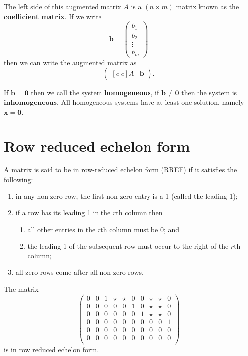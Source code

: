 The left side of this augmented matrix $A$ is a $(n\times m)$ matrix known as the \textbf{coefficient matrix}. If we write 
\[
    \bm b=
    \begin{pmatrix}
        b_1\\b_2\\\vdots\\b_m
    \end{pmatrix}
\]
then we can write the augmented matrix as
\[
    \begin{pmatrix}[c|c]
        A&\bm b
    \end{pmatrix}
    .
\]

If $\bm b=\bm0$ then we call the system \textbf{homogeneous}, if $\bm b\neq\bm0$ then the system is \textbf{inhomogeneous}. All homogeneous systems have at least one solution, namely $\bm x=\bm0$.

\section{Row reduced echelon form}

\begin{definition}
    A matrix is said to be in row-reduced echelon form (RREF) if it satisfies the following:
    \begin{enumerate}
        \item in any non-zero row, the first non-zero entry is a 1 (called the leading 1);
        \item if a row has its leading 1 in the $r$th column then
        \begin{enumerate}
            \item all other entries in the $r$th column must be $0$; and
            \item the leading 1 of the subsequent row must occur to the right of the $r$th column;
        \end{enumerate}
        \item all zero rows come after all non-zero rows.
    \end{enumerate}
\end{definition}

\begin{example}
    The matrix
    \[
        \begin{pmatrix}
            0&0&1&\star&\star&0&0&\star&\star&0\\
            0&0&0&0&0&1&0&\star&\star&0\\
            0&0&0&0&0&0&1&\star&\star&0\\
            0&0&0&0&0&0&0&0&0&1\\
            0&0&0&0&0&0&0&0&0&0\\
            0&0&0&0&0&0&0&0&0&0\\
        \end{pmatrix}
    \]
    is in row reduced echelon form.
\end{example}

